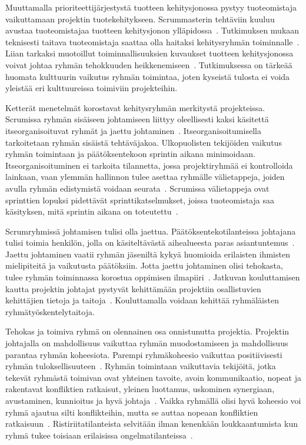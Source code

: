 \documentclass[finnish]{tktltiki2}
\theoremstyle{definition}
\theoremstyle{remark}
\begin{document}
Muuttamalla prioriteettijärjestystä tuotteen kehitysjonossa pystyy tuoteomistaja vaikuttamaan projektin tuotekehitykseen. Scrummasterin tehtäviin kuuluu avustaa tuoteomistajaa tuotteen kehitysjonon ylläpidossa~\cite{Nerur:2005:CMA:1060710.1060712}. Tutkimuksen mukaan teknisesti taitava tuoteomistaja saattaa olla haitaksi kehitysryhmän toiminnalle~\cite{Nerur:2005:CMA:1060710.1060712}. Liian tarkaksi muotoillut toiminnallisuuksien kuvaukset tuotteen kehitysjonossa voivat johtaa ryhmän tehokkuuden heikkenemiseen~\cite{Nerur:2005:CMA:1060710.1060712}. Tutkimuksessa on tärkeää huomata kulttuurin vaikutus ryhmän toimintaa, joten kyseistä tulosta ei voida yleistää eri kulttuureissa toimiviin projekteihin.

Ketterät menetelmät korostavat kehitysryhmän merkitystä projekteissa. Scrumissa ryhmän sisäiseen johtamiseen liittyy oleellisesti kaksi käsitettä itseorganisoituvat ryhmät ja jaettu johtaminen~\cite{4755768}. Itseorganisoitumisella tarkoitetaan ryhmän sisäistä tehtäväjakoa. Ulkopuolisten tekijöiden vaikutus ryhmän toimintaan ja päätöksentekoon sprintin aikana minimoidaan. Itseorganisoituminen ei tarkoita tilannetta, jossa projektiryhmää ei kontrolloida lainkaan, vaan ylemmän hallinnon tulee asettaa ryhmälle välietappeja, joiden avulla ryhmän edistymistä voidaan seurata~\cite{Nerur:2005:CMA:1060710.1060712}. Scrumissa välietappeja ovat sprinttien lopuksi pidettävät sprinttikatselmukset, joissa tuoteomistaja saa käsityksen, mitä sprintin aikana on toteutettu~\cite{schwaber1995scrum}.

Scrumryhmissä johtamisen tulisi olla jaettua. Päätöksentekotilanteissa johtajana tulisi toimia henkilön, jolla on käsiteltävästä aihealueesta paras asiantuntemus~\cite{4755768}. Jaettu johtaminen vaatii ryhmän jäseniltä kykyä huomioida erilaisten ihmisten mielipiteitä ja vaikutusta päätöksiin. Jotta jaettu johtaminen olisi tehokasta, tulee ryhmän toiminnassa korostua oppimisen ilmapiiri~\cite{4755768}. Jatkuvan kouluttamisen kautta projektin johtajat pystyvät kehittämään projektiin osallistuvien kehittäjien tietoja ja taitoja~\cite{dall2004project}. Kouluttamalla voidaan kehittää ryhmäläisten ryhmätyöskentelytaitoja.

Tehokas ja toimiva ryhmä on olennainen osa onnistunutta projektia. Projektin johtajalla on mahdollisuus vaikuttaa ryhmän muodostamiseen ja mahdollisuus parantaa ryhmän koheesiota. Parempi ryhmäkoheesio vaikuttaa positiivisesti ryhmän tuloksellisuuteen~\cite{bahli2005group, McLeod:2011:FAS:1978802.1978803}. Ryhmän toimintaan vaikuttavia tekijöitä, jotka tekevät ryhmästä toimivan ovat yhteinen tavoite, avoin kommunikaatio, nopeat ja rakentavat konfliktien ratkaisut, yleinen luottamus, uskominen synergiaan, avustaminen, kunnioitus ja hyvä johtaja~\cite{4017705}. Vaikka ryhmällä olisi hyvä koheesio voi ryhmä ajautua silti konflikteihin, mutta se auttaa nopeaan konfliktien ratkaisuun~\cite{bradley1997effect}. Ristiriitatilanteista selvitään ilman kenenkään loukkaantumista kun ryhmä tukee toisiaan erilaisissa ongelmatilanteissa~\cite{bradley1997effect}.
\end{document}
